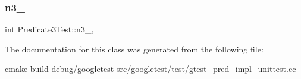 \subsubsection{\texorpdfstring{n3\_}{n3\_}}
{\footnotesize\ttfamily int Predicate3\+Test\+::n3\+\_\+\hspace{0.3cm}{\ttfamily [static]}, {\ttfamily [protected]}}



The documentation for this class was generated from the following file\+:\begin{DoxyCompactItemize}
\item 
cmake-\/build-\/debug/googletest-\/src/googletest/test/\mbox{\hyperlink{gtest__pred__impl__unittest_8cc}{gtest\+\_\+pred\+\_\+impl\+\_\+unittest.\+cc}}\end{DoxyCompactItemize}
